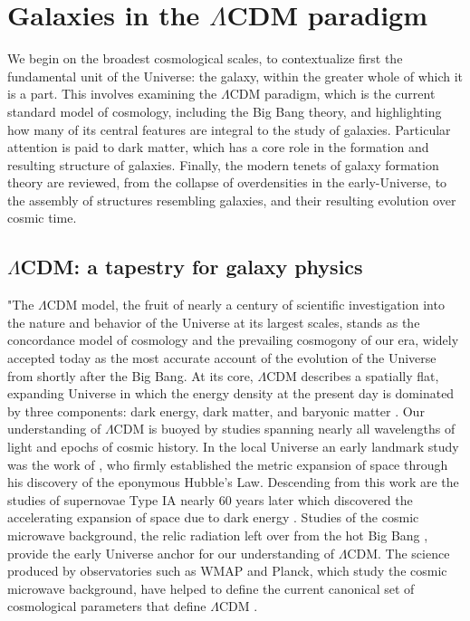 \section{Galaxies in the \texorpdfstring{$\Lambda$CDM}{LambdaCDM} paradigm}

We begin on the broadest cosmological scales, to contextualize first the fundamental unit of the Universe: the galaxy, within the greater whole of which it is a part. This involves examining the $\Lambda$CDM paradigm, which is the current standard model of cosmology, including the Big Bang theory, and highlighting how many of its central features are integral to the study of galaxies. Particular attention is paid to dark matter, which has a core role in the formation and resulting structure of galaxies. Finally, the modern tenets of galaxy formation theory are reviewed, from the collapse of overdensities in the early-Universe, to the assembly of structures resembling galaxies, and their resulting evolution over cosmic time.

\subsection{\texorpdfstring{$\Lambda$CDM}{LambdaCDM}: a tapestry for galaxy physics}

"The $\Lambda$CDM model, the fruit of nearly a century of scientific investigation into the nature and behavior of the Universe at its largest scales, stands as the concordance model of cosmology and the prevailing cosmogony of our era, widely accepted today as the most accurate account of the evolution of the Universe from shortly after the Big Bang. At its core, $\Lambda$CDM describes a spatially flat, expanding Universe in which the energy density at the present day is dominated by three components: dark energy, dark matter, and baryonic matter \parencite[e.g.][]{perlmutter99,wmap03,sdssbao05,planck15}. Our understanding of $\Lambda$CDM is buoyed by studies spanning nearly all wavelengths of light and epochs of cosmic history. In the local Universe an early landmark study was the work of \textcite{hubble29}, who firmly established the metric expansion of space through his discovery of the eponymous Hubble's Law. Descending from this work are the studies of supernovae Type IA nearly 60 years later which discovered the accelerating expansion of space due to dark energy \parencite{riess98,perlmutter99}. Studies of the cosmic microwave background, the relic radiation left over from the hot Big Bang \parencite{penzias65}, provide the early Universe anchor for our understanding of $\Lambda$CDM. The science produced by observatories such as WMAP and Planck, which study the cosmic microwave background, have helped to define the current canonical set of cosmological parameters that define $\Lambda$CDM \parencite{wmap03,planck15}.

